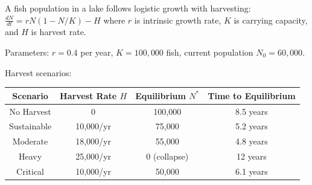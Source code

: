 \documentclass[12pt]{article}
\begin{document}
A fish population in a lake follows logistic growth with harvesting: $\frac{dN}{dt} = rN(1 - N/K) - H$ where $r$ is intrinsic growth rate, $K$ is carrying capacity, and $H$ is harvest rate.

Parameters: $r = 0.4$ per year, $K = 100,000$ fish, current population $N_0 = 60,000$.

Harvest scenarios:

\begin{center}
\begin{tabular}{cccc}
\toprule
Scenario & Harvest Rate $H$ & Equilibrium $N^*$ & Time to Equilibrium \\
\midrule
No Harvest & 0 & 100,000 & 8.5 years \\
Sustainable & 10,000/yr & 75,000 & 5.2 years \\
Moderate & 18,000/yr & 55,000 & 4.8 years \\
Heavy & 25,000/yr & 0 (collapse) & 12 years \\
Critical & 10,000/yr & 50,000 & 6.1 years \\
\bottomrule
\end{tabular}
\end{center}
\end{document}
